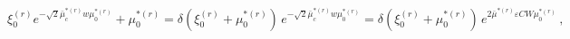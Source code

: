 \begin{equation}
\xi _{0}^{(r)}e^{-\sqrt{2}\bar{\mu}_{c}^{\ast (r)}w\mu _{0}^{\ast (r)}}+\mu
_{0}^{\ast (r)}=\delta (\xi _{0}^{(r)}+\mu _{0}^{\ast (r)})\,e^{-\sqrt{2}%
\bar{\mu}_{c}^{\ast (r)}w\mu _{0}^{\ast (r)}}=\delta (\xi _{0}^{(r)}+\mu
_{0}^{\ast (r)})\,e^{2\bar{\mu}^{\ast (r)}\varepsilon CW\mu _{0}^{\ast
(r)}}\,,
\end{equation}

